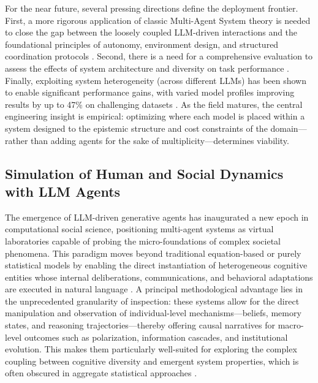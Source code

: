 \documentclass[11pt,a4paper]{article}
\begin{document}
For the near future, several pressing directions define the deployment frontier. First, a more rigorous application of classic Multi-Agent System theory is needed to close the gap between the loosely coupled LLM-driven interactions and the foundational principles of autonomy, environment design, and structured coordination protocols \cite{arxiv:2505.21298v4}. Second, there is a need for a comprehensive evaluation to assess the effects of system architecture and diversity on task performance \cite{arxiv:2512.08296v3,arxiv:2503.01935v1}. Finally, exploiting system heterogeneity (across different LLMs) has been shown to enable significant performance gains, with varied model profiles improving results by up to 47\% on challenging datasets \cite{arxiv:2505.16997v1}. As the field matures, the central engineering insight is empirical: optimizing where each model is placed within a system designed to the epistemic structure and cost constraints of the domain---rather than adding agents for the sake of multiplicity---determines viability.


\subsection{Simulation of Human and Social Dynamics with LLM Agents}


The emergence of LLM-driven generative agents has inaugurated a new epoch in computational social science, positioning multi-agent systems as virtual laboratories capable of probing the micro-foundations of complex societal phenomena. This paradigm moves beyond traditional equation-based or purely statistical models by enabling the direct instantiation of heterogeneous cognitive entities whose internal deliberations, communications, and behavioral adaptations are executed in natural language \cite{arxiv:2504.16736v3}. A principal methodological advantage lies in the unprecedented granularity of inspection: these systems allow for the direct manipulation and observation of individual-level mechanisms---beliefs, memory states, and reasoning trajectories---thereby offering causal narratives for macro-level outcomes such as polarization, information cascades, and institutional evolution. This makes them particularly well-suited for exploring the complex coupling between cognitive diversity and emergent system properties, which is often obscured in aggregate statistical approaches \cite{arxiv:2506.08292v1}.
\end{document}
